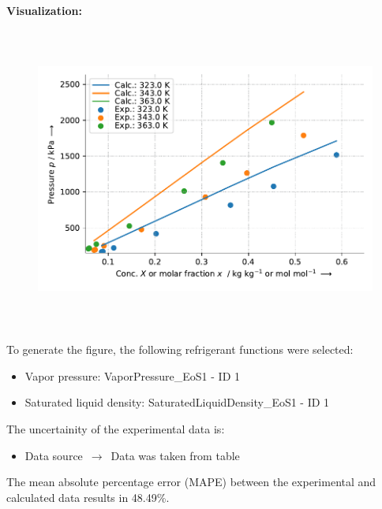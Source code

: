 \textbf{Visualization:}
%
\begin{figure}[!htp]
{\noindent\includegraphics[height=10cm, keepaspectratio]{figs/abs/abs_R-143a_lubricant_PEB6_FloryHuggins_1.pdf}}
\end{figure}
%

To generate the figure, the following refrigerant functions were selected:
\begin{itemize}
\item Vapor pressure: VaporPressure\_EoS1 - ID 1
\item Saturated liquid density: SaturatedLiquidDensity\_EoS1 - ID 1
\end{itemize}

The uncertainity of the experimental data is:
\begin{itemize}
\item Data source $\,\to\,$ Data was taken from table
\end{itemize}

The mean absolute percentage error (MAPE) between the experimental and calculated data results in 48.49\%.
\FloatBarrier
\newpage
